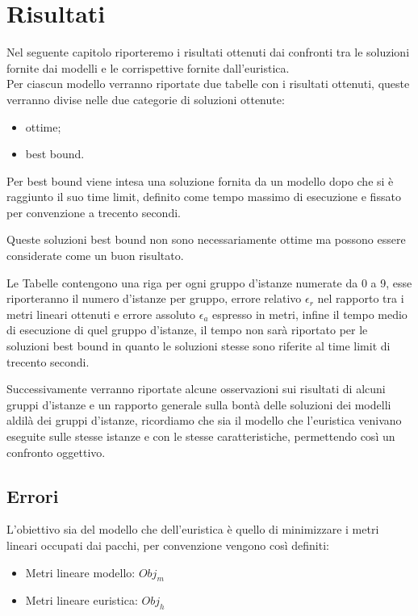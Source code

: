 
\hypertarget{(chap:capitolo7)}{}
\chapter{Risultati}
Nel seguente capitolo riporteremo i risultati ottenuti dai confronti tra le soluzioni fornite dai modelli e le corrispettive fornite dall'euristica.\\
Per ciascun modello verranno riportate due tabelle con i risultati ottenuti, queste verranno divise nelle due categorie di soluzioni ottenute:
\begin{itemize}
	\item ottime;
	\item best bound.
\end{itemize} 
Per best bound viene intesa una soluzione fornita da un modello dopo che si è raggiunto il suo time limit, definito come tempo massimo di esecuzione e fissato per convenzione a trecento secondi. 

Queste soluzioni best bound non sono necessariamente ottime ma possono essere considerate come un buon risultato.

Le Tabelle contengono una riga per ogni gruppo d'istanze numerate da 0 a 9, esse riporteranno il numero d'istanze per gruppo, errore relativo $\epsilon_r$ nel rapporto tra i metri lineari ottenuti e errore assoluto $\epsilon_a$ espresso in metri, infine il tempo medio di esecuzione di quel gruppo d'istanze, il tempo non sarà riportato per le soluzioni best bound in quanto le soluzioni stesse sono riferite al time limit di trecento secondi.

Successivamente verranno riportate alcune osservazioni sui risultati di alcuni gruppi d'istanze e un rapporto generale sulla bontà delle soluzioni dei modelli aldilà dei gruppi d'istanze, ricordiamo che sia il modello che l'euristica venivano eseguite sulle stesse istanze e con le stesse caratteristiche, permettendo così un confronto oggettivo.

\section{Errori}
L'obiettivo sia del modello che dell'euristica è quello di minimizzare i metri lineari occupati dai pacchi, per convenzione vengono così definiti:
\begin{itemize}
	\item Metri lineare modello: $Obj_m$
	\item Metri lineare euristica: $Obj_h$
\end{itemize}

